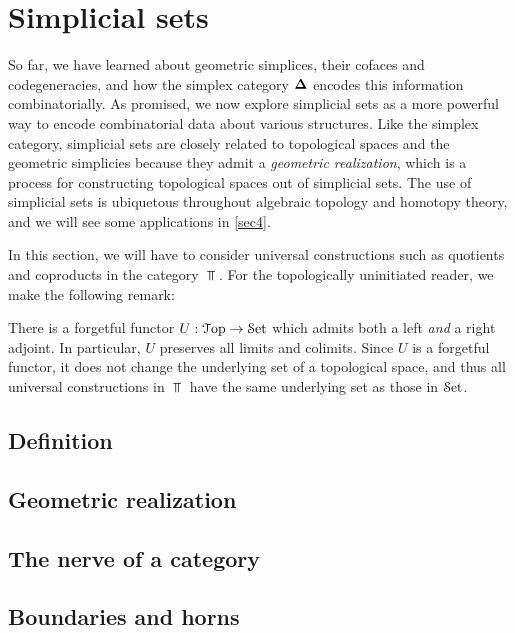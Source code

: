 \section{Simplicial sets}\label{sec3}

So far, we have learned about geometric simplices, their cofaces and codegeneracies, and how the simplex category $\boldsymbol{\Delta}$ encodes this information combinatorially. As promised, we now explore simplicial sets as a more powerful way to encode combinatorial data about various structures. Like the simplex category, simplicial sets are closely related to topological spaces and the geometric simplicies because they admit a \emph{geometric realization}, which is a process for constructing topological spaces out of simplicial sets. The use of simplicial sets is ubiquetous throughout algebraic topology and homotopy theory, and we will see some applications in \cref{sec4}.

In this section, we will have to consider universal constructions such as quotients and coproducts in the category $\Top$. For the topologically uninitiated reader, we make the following remark:

\begin{remark}\label{3.0.1}
    There is a forgetful functor $U:\mathcal{T}\mathrm{op}\to\mathcal{S}\mathrm{et}$ which admits both a left \emph{and} a right adjoint. In particular, $U$ preserves all limits and colimits. Since $U$ is a forgetful functor, it does not change the underlying set of a topological space, and thus all universal constructions in $\Top$ have the same underlying set as those in $\mathcal{S}\mathrm{et}$.
\end{remark}


\subsection{Definition}\label{sec3.1}

\subsection{Geometric realization}\label{sec3.2}

\subsection{The nerve of a category}\label{sec3.3}

\subsection{Boundaries and horns}\label{sec3.4}


